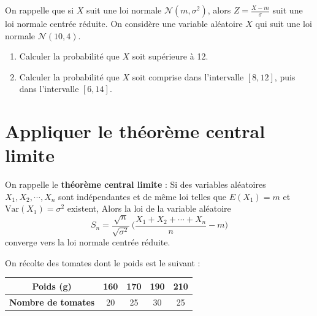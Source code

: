    On rappelle que si $X$ suit une loi normale $\mathcal{N}(m, \sigma^2)$, alors $Z = \frac{X - m}{\sigma}$ suit une loi normale centrée réduite. 
   On considère une variable aléatoire $X$ qui suit une loi normale $\mathcal{N}(10, 4)$. 
   \begin{enumerate}
    \item Calculer la probabilité que $X$ soit supérieure à 12. 
    \item Calculer la probabilité que $X$ soit comprise dans l'intervalle $[8, 12]$, puis dans l'intervalle $[6, 14]$.
   \end{enumerate}

   
   \vspace{0.1cm}

   \section*{Appliquer le théorème central limite}


On rappelle le \textbf{théorème central limite} : 
Si des variables aléatoires $X_1, X_2, \cdots, X_n$ sont indépendantes et de même loi telles que $E(X_1) = m$ et $\text{Var}(X_1) = \sigma^2$ existent, 
Alors la loi de la variable aléatoire 
$$S_n = \frac{\sqrt{n}}{\sqrt{\sigma^2}} \, \bigg(\frac{X_1 + X_2 + \cdots + X_n}{n} - m\bigg)$$ 
converge vers la loi normale centrée réduite. 


    On récolte des tomates dont le poids est le suivant : 
\begin{table}[h]
    \centering
    \begin{tabular}{|c|c|c|c|c|}
        \hline
        \textbf{Poids (g)} & 160 & 170 & 190 & 210 \\
        \hline
        \textbf{Nombre de tomates} & 20 & 25 & 30 & 25 \\
        \hline
    \end{tabular}
\end{table}

